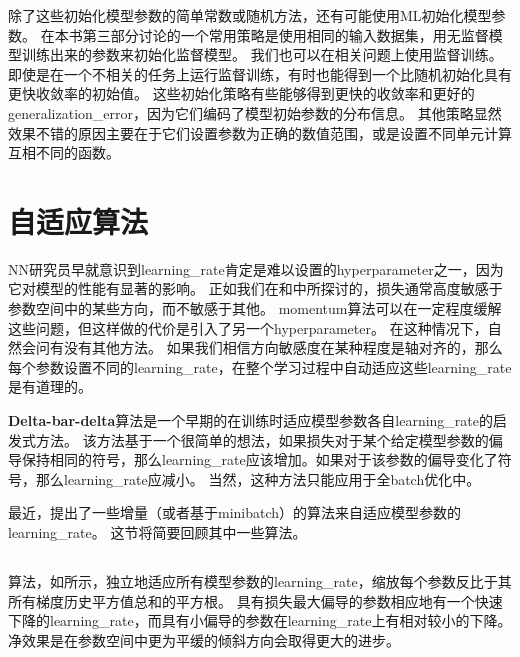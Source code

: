 除了这些初始化模型参数的简单常数或随机方法，还有可能使用\gls{ML}初始化模型参数。
在本书第三部分讨论的一个常用策略是使用相同的输入数据集，用无监督模型训练出来的参数来初始化监督模型。
我们也可以在相关问题上使用监督训练。
即使是在一个不相关的任务上运行监督训练，有时也能得到一个比随机初始化具有更快收敛率的初始值。
这些初始化策略有些能够得到更快的收敛率和更好的\gls{generalization_error}，因为它们编码了模型初始参数的分布信息。
其他策略显然效果不错的原因主要在于它们设置参数为正确的数值范围，或是设置不同单元计算互相不同的函数。


\section{自适应算法}
\label{sec:algorithms_with_adaptive_learning_rates}
\gls{NN}研究员早就意识到\gls{learning_rate}肯定是难以设置的\gls{hyperparameter}之一，因为它对模型的性能有显著的影响。
正如我们在和中所探讨的，损失通常高度敏感于参数空间中的某些方向，而不敏感于其他。
\gls{momentum}算法可以在一定程度缓解这些问题，但这样做的代价是引入了另一个\gls{hyperparameter}。
在这种情况下，自然会问有没有其他方法。
如果我们相信方向敏感度在某种程度是轴对齐的，那么每个参数设置不同的\gls{learning_rate}，在整个学习过程中自动适应这些\gls{learning_rate}是有道理的。



\textbf{Delta-bar-delta}算法\citep{Jacobs-1988}是一个早期的在训练时适应模型参数各自\gls{learning_rate}的启发式方法。
该方法基于一个很简单的想法，如果损失对于某个给定模型参数的偏导保持相同的符号，那么\gls{learning_rate}应该增加。如果对于该参数的偏导变化了符号，那么\gls{learning_rate}应减小。
当然，这种方法只能应用于全\gls{batch}优化中。


最近，提出了一些增量（或者基于\gls{minibatch}）的算法来自适应模型参数的\gls{learning_rate}。
这节将简要回顾其中一些算法。


\subsection{}
\label{sec:adagrad}
算法，如所示，独立地适应所有模型参数的\gls{learning_rate}，缩放每个参数反比于其所有梯度历史平方值总和的平方根\citep{Duchi-et-al-2011}。
具有损失最大偏导的参数相应地有一个快速下降的\gls{learning_rate}，而具有小偏导的参数在\gls{learning_rate}上有相对较小的下降。
净效果是在参数空间中更为平缓的倾斜方向会取得更大的进步。


